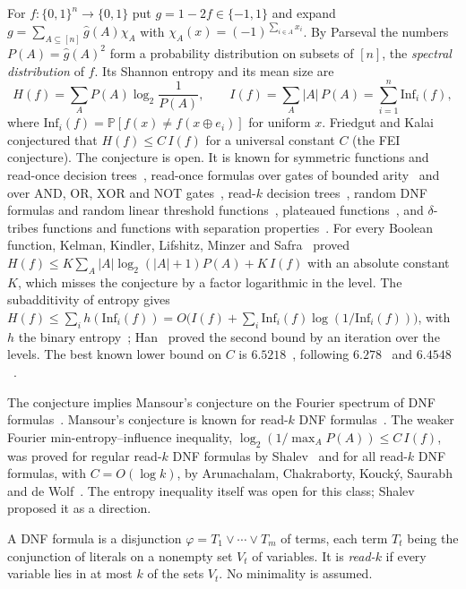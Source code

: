 \documentclass[11pt]{amsart}
\theoremstyle{definition}
\theoremstyle{remark}
\renewcommand{\Pr}{\mathbb{P}}
\newcommand{\Inf}{\mathrm{Inf}}
\newcommand{\hatg}{\widehat{g}}
\newcommand{\bits}{\{0,1\}}
\begin{document}
For $f:\bits^n\to\bits$ put $g=1-2f\in\{-1,1\}$ and expand $g=\sum_{A\subseteq[n]}\hatg(A)\chi_A$ with
$\chi_A(x)=(-1)^{\sum_{i\in A}x_i}$. By Parseval the numbers $P(A)=\hatg(A)^2$ form a probability distribution on
subsets of $[n]$, the \emph{spectral distribution} of $f$. Its Shannon entropy and its mean size are
\[
H(f)=\sum_{A}P(A)\log_2\frac{1}{P(A)},\qquad I(f)=\sum_A|A|\,P(A)=\sum_{i=1}^n\Inf_i(f),
\]
where $\Inf_i(f)=\Pr[f(x)\ne f(x\oplus e_i)]$ for uniform $x$. Friedgut and Kalai~\cite{FK96} conjectured that
$H(f)\le C\,I(f)$ for a universal constant $C$ (the FEI conjecture). The conjecture is open. It is known for
symmetric functions and read-once decision trees~\cite{OWZ11}, read-once formulas over gates of bounded
arity~\cite{OT13} and over $\mathrm{AND}$, $\mathrm{OR}$, $\mathrm{XOR}$ and $\mathrm{NOT}$ gates~\cite{CKLS16}, read-$k$ decision trees~\cite{WWW14,Sha18}, random DNF formulas and random linear
threshold functions~\cite{KLW10,CKKLS18}, plateaued functions~\cite{Pot26}, and $\delta$-tribes functions and functions with
separation properties~\cite{GMP26}. For every Boolean function, Kelman, Kindler, Lifshitz, Minzer and
Safra~\cite{KKLMS20} proved $H(f)\le K\sum_A|A|\log_2(|A|+1)P(A)+K\,I(f)$ with an absolute constant $K$, which
misses the conjecture by a factor logarithmic in the level. The subadditivity of entropy gives
$H(f)\le\sum_ih(\Inf_i(f))=O\bigl(I(f)+\sum_i\Inf_i(f)\log(1/\Inf_i(f))\bigr)$, with $h$ the binary
entropy~\cite{KMS12}; Han~\cite{Han25} proved the second bound by an iteration over the levels. The best known lower
bound on $C$ is
$6.5218$~\cite{Num26}, following $6.278$~\cite{OT13} and $6.4548$~\cite{Hod17}.

The conjecture implies Mansour's conjecture on the Fourier spectrum of DNF formulas~\cite{Man95,OWZ11}. Mansour's
conjecture is known for read-$k$ DNF formulas~\cite{KLW10}. The weaker Fourier min-entropy--influence inequality,
$\log_2(1/\max_A P(A))\le C\,I(f)$, was proved for regular read-$k$ DNF formulas by Shalev~\cite{Sha18} and for all
read-$k$ DNF formulas, with $C=O(\log k)$, by Arunachalam, Chakraborty, Kouck\'y, Saurabh and de Wolf~\cite{ACKSW21}.
The entropy inequality itself was open for this class; Shalev~\cite{Sha18} proposed it as a direction.

A DNF formula is a disjunction $\varphi=T_1\vee\cdots\vee T_m$ of terms, each term $T_t$ being the conjunction of
literals on a nonempty set $V_t$ of variables. It is \emph{read-$k$} if every variable lies in at most $k$ of the
sets $V_t$. No minimality is assumed.
\end{document}
